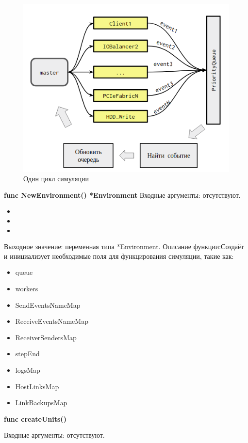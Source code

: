 \begin{figure}[!ht]
	\centering
	\includegraphics[width=\textwidth]{Kenenbek/images/loop.png}
	\caption{Один цикл симуляции}
	\label{fig:loop}
\end{figure}  

\textbf{func NewEnvironment() *Environment}
Входные аргументы: отсутствуют.
\begin{itemize}
	\item 
	\item 
	\item 
\end{itemize}
Выходное значение: переменная типа *Environment.
Описание функции:Создаёт и инициализует необходимые поля для функцирования симуляции, такие как:
\begin{itemize}
	\item 		queue           
	\item 		workers        
	\item 		SendEventsNameMap 
	\item 		ReceiveEventsNameMap
	\item 		ReceiverSendersMap
	\item 		stepEnd
	\item 		logsMap
	\item 		HostLinksMap
	\item 		LinkBackupsMap
\end{itemize}

\textbf{func createUnits()}

Входные аргументы: отсутствуют.

